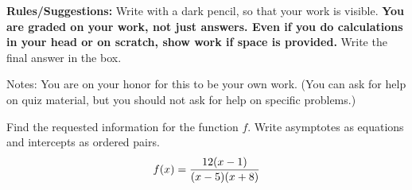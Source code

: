 \documentclass[11pt,addpoints,answers]{exam}
\begin{document}


{\small \noindent \textbf{Rules/Suggestions:} Write with a dark pencil, so that your work is visible.  \textbf{You are graded on your work, not just answers. Even if you do calculations in your head or on scratch, show work if space is provided. } Write the final answer in the box.

Notes: You are on your honor for this to be your own work.  (You can ask for help on quiz material, but you should not ask for help on specific problems.) }
\begin{questions}

\question Find the requested information for the function $f$. Write asymptotes as equations and intercepts as ordered pairs.
$$ f(x)= \dfrac{12(x-1)}{(x-5)(x+8)}\\$$
\vspace{.1cm}
\begin{multicols}{2}

\end{multicols}
\end{questions}
\end{document}
